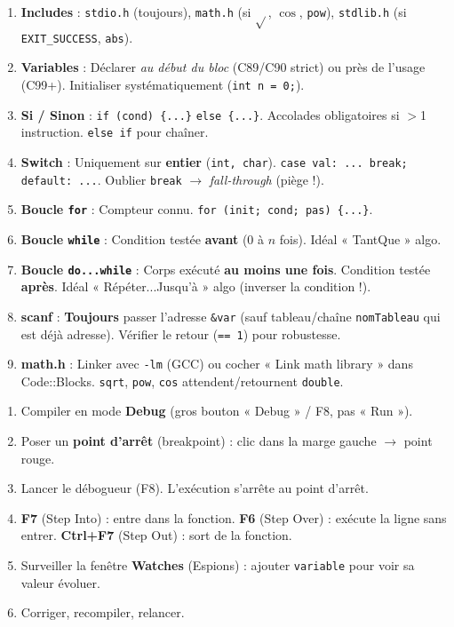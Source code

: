 \documentclass[11pt]{article}
\begin{document}
\begin{bilan}
\begin{methode}
\begin{enumerate}
    \item \textbf{Includes} : \texttt{stdio.h} (toujours), \texttt{math.h} (si $\sqrt{}$, $\cos{}$, \texttt{pow}), \texttt{stdlib.h} (si \texttt{EXIT\_SUCCESS}, \texttt{abs}).
    \item \textbf{Variables} : Déclarer \emph{au début du bloc} (C89/C90 strict) ou près de l'usage (C99+). Initialiser systématiquement (\texttt{int n = 0;}).
    \item \textbf{Si / Sinon} : \texttt{if (cond) \{...\}} \texttt{else \{...\}}. Accolades obligatoires si $>$1 instruction. \texttt{else if} pour chaîner.
    \item \textbf{Switch} : Uniquement sur \textbf{entier} (\texttt{int, char}). \texttt{case val: ... break;} \texttt{default: ...}. Oublier \texttt{break} $\to$ \emph{fall-through} (piège !).
    \item \textbf{Boucle \texttt{for}} : Compteur connu. \texttt{for (init; cond; pas) \{...\}}.
    \item \textbf{Boucle \texttt{while}} : Condition testée \textbf{avant} (0 à $n$ fois). Idéal « TantQue » algo.
    \item \textbf{Boucle \texttt{do...while}} : Corps exécuté \textbf{au moins une fois}. Condition testée \textbf{après}. Idéal « Répéter...Jusqu'à » algo (inverser la condition !).
    \item \textbf{scanf} : \textbf{Toujours} passer l'adresse \texttt{\&var} (sauf tableau/chaîne \texttt{nomTableau} qui est déjà adresse). Vérifier le retour (\texttt{== 1}) pour robustesse.
    \item \textbf{math.h} : Linker avec \texttt{-lm} (GCC) ou cocher « Link math library » dans Code::Blocks. \texttt{sqrt}, \texttt{pow}, \texttt{cos} attendent/retournent \texttt{double}.
\end{enumerate}
\end{methode}

\begin{methode}
\begin{enumerate}
    \item Compiler en mode \textbf{Debug} (gros bouton « Debug » / F8, pas « Run »).
    \item Poser un \textbf{point d'arrêt} (breakpoint) : clic dans la marge gauche $\to$ point rouge.
    \item Lancer le débogueur (F8). L'exécution s'arrête au point d'arrêt.
    \item \textbf{F7} (Step Into) : entre dans la fonction. \textbf{F6} (Step Over) : exécute la ligne sans entrer. \textbf{Ctrl+F7} (Step Out) : sort de la fonction.
    \item Surveiller la fenêtre \textbf{Watches} (Espions) : ajouter \texttt{variable} pour voir sa valeur évoluer.
    \item Corriger, recompiler, relancer.
\end{enumerate}
\end{methode}

\end{bilan}
\end{document}
